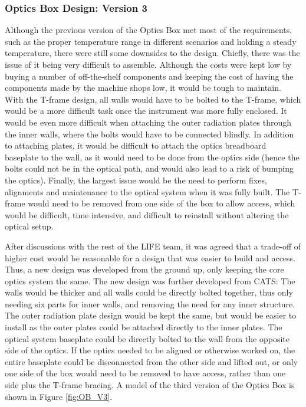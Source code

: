 \subsubsection{Optics Box Design: Version 3}
Although the previous version of the Optics Box met most of the requirements, such as the proper temperature range in different scenarios and holding a steady temperature, there were still some downsides to the design. Chiefly, there was the issue of it being very difficult to assemble. Although the costs were kept low by buying a number of off-the-shelf components and keeping the cost of having the components made by the machine shops low, it would be tough to maintain. With the T-frame design, all walls would have to be bolted to the T-frame, which would be a more difficult task once the instrument was more fully enclosed. It would be even more difficult when attaching the outer radiation plates through the inner walls, where the bolts would have to be connected blindly. In addition to attaching plates, it would be difficult to attach the optics breadboard baseplate to the wall, as it would need to be done from the optics side (hence the bolts could not be in the optical path, and would also lead to a risk of bumping the optics). Finally, the largest issue would be the need to perform fixes, alignments and maintenance to the optical system when it was fully built. The T-frame would need to be removed from one side of the box to allow access, which would be difficult, time intensive, and difficult to reinstall without altering the optical setup.

After discussions with the rest of the LIFE team, it was agreed that a trade-off of higher cost would be reasonable for a design that was easier to build and access. Thus, a new design was developed from the ground up, only keeping the core optics system the same. The new design was further developed from CATS: The walls would be thicker and all walls could be directly bolted together, thus only needing six parts for inner walls, and removing the need for any inner structure. The outer radiation plate design would be kept the same, but would be easier to install as the outer plates could be attached directly to the inner plates. The optical system baseplate could be directly bolted to the wall from the opposite side of the optics. If the optics needed to be aligned or otherwise worked on, the entire baseplate could be disconnected from the other side and lifted out, or only one side of the box would need to be removed to have access, rather than one side plus the T-frame bracing. A model of the third version of the Optics Box is shown in Figure \ref{fig:OB_V3}. 

